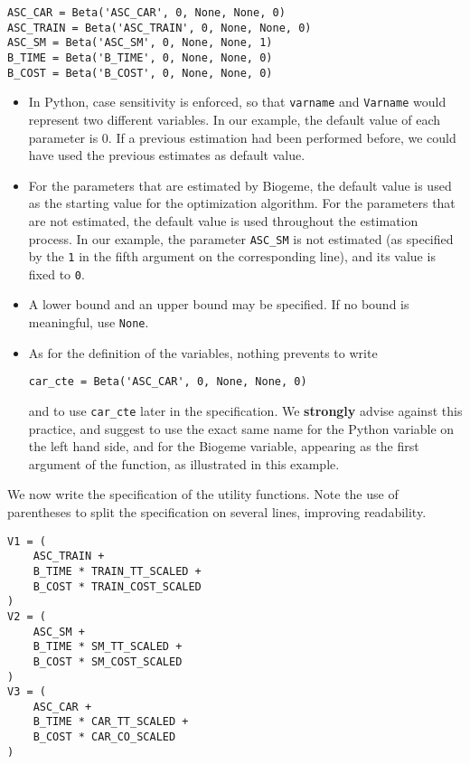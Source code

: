 \documentclass[12pt,a4paper]{article}
\begin{document}
\begin{lstlisting}[style=nonumbers]
ASC_CAR = Beta('ASC_CAR', 0, None, None, 0)
ASC_TRAIN = Beta('ASC_TRAIN', 0, None, None, 0)
ASC_SM = Beta('ASC_SM', 0, None, None, 1)
B_TIME = Beta('B_TIME', 0, None, None, 0)
B_COST = Beta('B_COST', 0, None, None, 0)
\end{lstlisting}

\begin{itemize}
\item  In Python, case sensitivity is enforced, so that
\verb+varname+ and \verb+Varname+ would represent two different
variables.  In our example, the default value of each parameter is
0. If a previous estimation had been performed before, we could have
used the previous estimates as default value.
\item For the
parameters that are estimated by Biogeme, the default value is used
as the starting value for the optimization algorithm. For the
parameters that are not estimated, the default value is used
throughout the estimation process. In our example, the parameter
\lstinline$ASC_SM$ is not estimated (as specified by the \lstinline$1$
in the fifth argument on the corresponding line), and its value is
fixed to \lstinline$0$.
\item 
A lower bound and an upper bound may be
specified. If no bound is meaningful,  use \lstinline$None$.
\item As for the definition of the variables, nothing prevents to write
\begin{lstlisting}[style=nonumbers]
car_cte = Beta('ASC_CAR', 0, None, None, 0)
\end{lstlisting}
and to use \lstinline+car_cte+ later in the specification.   We
\textbf{strongly} advise against this practice, and suggest to use the
exact same name for the Python variable on the left hand side, and for
the Biogeme variable, appearing as the first argument of the
function, as illustrated in this example. 
\end{itemize}


We now write the specification of the
utility functions. Note the use of parentheses to split the specification on several lines, improving readability. 

\begin{lstlisting}[style=nonumbers]
V1 = (
    ASC_TRAIN +
    B_TIME * TRAIN_TT_SCALED +
    B_COST * TRAIN_COST_SCALED
)
V2 = (
    ASC_SM +
    B_TIME * SM_TT_SCALED +
    B_COST * SM_COST_SCALED
)
V3 = (
    ASC_CAR +
    B_TIME * CAR_TT_SCALED +
    B_COST * CAR_CO_SCALED
)
\end{lstlisting}
\end{document}
